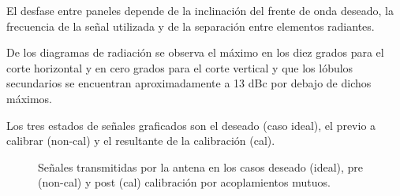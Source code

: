 El desfase entre paneles depende de la inclinación del frente de onda deseado, la frecuencia de la señal utilizada y de la
separación entre elementos radiantes.

De los diagramas de radiación se observa el máximo en los diez grados para el corte horizontal y en cero grados para el corte
vertical y que los lóbulos secundarios se encuentran aproximadamente a 13 dBc por debajo de dichos máximos.

Los tres estados de señales graficados son el deseado (caso ideal), el previo a calibrar (non-cal) y el resultante de la
calibración (cal).
\begin{figure}[H]
	\centering

	\caption{Señales transmitidas por la antena en los casos deseado (ideal), pre (non-cal) y post (cal) calibración por acoplamientos mutuos.}
	\label{fig:nonErrMutual10degCol}
\end{figure}
